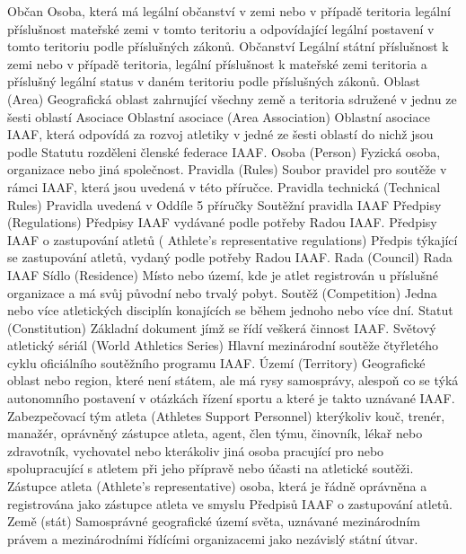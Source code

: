 \dend
\dt Občan
\dd Osoba, která má legální občanství v zemi nebo v případě teritoria legální příslušnost mateřské zemi v tomto teritoriu a odpovídající legální postavení v tomto teritoriu podle příslušných zákonů.
\dend
\dt Občanství
\dd Legální státní příslušnost k zemi nebo v případě teritoria, legální příslušnost k mateřské zemi teritoria a příslušný legální status v daném teritoriu podle příslušných zákonů.
\dend
\dt Oblast (Area)
\dd Geografická oblast zahrnující všechny země a teritoria sdružené v jednu ze šesti oblastí Asociace
\dend
\dt Oblastní asociace (Area Association)
\dd Oblastní asociace IAAF, která odpovídá za rozvoj atletiky v jedné ze šesti oblastí do nichž jsou podle Statutu rozděleni členské federace IAAF.
\dend
\dt Osoba (Person)
\dd Fyzická osoba, organizace nebo jiná společnost.
\dend
\dt Pravidla (Rules)
\dd Soubor pravidel pro soutěže v rámci IAAF, která jsou uvedená v této příručce.
\dend
\dt Pravidla technická (Technical Rules)
\dd Pravidla uvedená v Oddíle 5 příručky Soutěžní pravidla IAAF
\dend
\dt Předpisy (Regulations)
\dd Předpisy IAAF vydávané podle potřeby Radou IAAF.
\dend
\dt Předpisy IAAF o zastupování atletů ( Athlete's representative regulations)
\dd Předpis týkající se zastupování atletů, vydaný podle potřeby Radou IAAF.
\dend
\dt Rada (Council)
\dd Rada IAAF
\dend
\dt Sídlo (Residence)
\dd Místo nebo území, kde je atlet registrován u příslušné organizace a má svůj původní nebo trvalý pobyt.
\dend
\dt Soutěž (Competition)
\dd Jedna nebo více atletických disciplín konajících se během jednoho nebo více dní.
\dend
\dt Statut (Constitution)
\dd Základní dokument jímž se řídí veškerá činnost IAAF.
\dend
\dt Světový atletický sériál (World Athletics Series)
\dd Hlavní mezinárodní soutěže čtyřletého cyklu oficiálního soutěžního programu IAAF.
\dend
\dt Území (Territory)
\dd Geografické oblast nebo region, které není státem, ale má rysy samosprávy, alespoň co se týká autonomního postavení v otázkách řízení sportu a které je takto uznávané IAAF.
\dend
\dt Zabezpečovací tým atleta (Athletes Support Personnel)
\dd kterýkoliv kouč, trenér, manažér, oprávněný zástupce atleta, agent, člen týmu, činovník, lékař nebo zdravotník, vychovatel nebo kterákoliv jiná osoba pracující pro nebo spolupracující s atletem při jeho přípravě nebo účasti na atletické soutěži.
\dend
\dt Zástupce atleta (Athlete's representative)
\dd osoba, která je řádně oprávněna a registrována jako zástupce atleta ve smyslu Předpisů IAAF o zastupování atletů.
\dend
\dt Země (stát)
\dd Samosprávné geografické území světa, uznávané mezinárodním právem a mezinárodními řídícími organizacemi jako nezávislý státní útvar.
\dend


